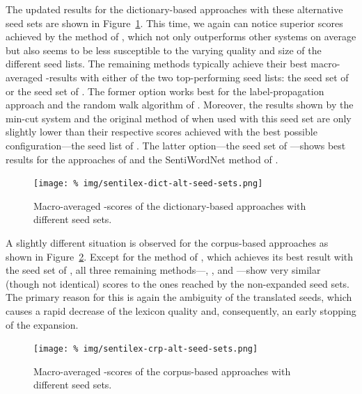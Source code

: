 The updated results for the dictionary-based approaches with these
alternative seed sets are shown in
Figure~\ref{snt:fig:sent-dict-lex-alt-seeds}.  This time, we again can
notice superior scores achieved by the method of
\citet{Blair-Goldensohn:08}, which not only outperforms other systems
on average but also seems to be less susceptible to the varying
quality and size of the different seed lists.  The remaining methods
typically achieve their best macro-averaged \F{}-results with either
of the two top-performing seed lists: the seed set of \citet{Kim:04}
or the seed set of \citet{Esuli:06c}.  The former option works best
for the label-propagation approach \citet{Rao:09} and the random walk
algorithm of \citet{Awadallah:10}.  Moreover, the results shown by the
min-cut system \cite{Rao:09} and the original method of \citet{Kim:04}
when used with this seed set are only slightly lower than their
respective scores achieved with the best possible configuration---the
seed list of \citet{Turney:02}.  The latter option---the seed set of
\citet{Esuli:06c}---shows best results for the approaches of
\citet{Hu:04} and the SentiWordNet method of \citet{Esuli:06c}.

\begin{figure}[hbtp!]
  \centering
  \texttt{[image: \%
    img/sentilex-dict-alt-seed-sets.png]}
  \caption{Macro-averaged \F{}-scores of the dictionary-based approaches
    with different seed sets.}\label{snt:fig:sent-dict-lex-alt-seeds}
\end{figure}

A slightly different situation is observed for the corpus-based
approaches as shown in Figure~\ref{snt:fig:sent-crp-lex-alt-seeds}.
Except for the method of \citet{Takamura:05}, which achieves its best
result with the seed set of \citet{Hu:04}, all three remaining
methods---\citet{Velikovich:10}, \citet{Kiritchenko:14}, and
\citet{Severyn:15}---show very similar (though not identical) scores
to the ones reached by the non-expanded seed sets.  The primary reason
for this is again the ambiguity of the translated seeds, which causes
a rapid decrease of the lexicon quality and, consequently, an early
stopping of the expansion.

\begin{figure}[hbtp!]
  \centering
  \texttt{[image: \%
    img/sentilex-crp-alt-seed-sets.png]}
  \caption{Macro-averaged \F{}-scores of the corpus-based approaches
  with different seed sets.}\label{snt:fig:sent-crp-lex-alt-seeds}
\end{figure}

